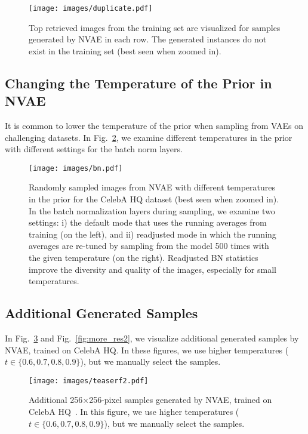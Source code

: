 \documentclass{article}
\begin{document}
\begin{figure}
\centering
\texttt{[image: images/duplicate.pdf]}
\caption{Top retrieved images from the training set are visualized for samples generated by NVAE in each row. The generated instances do not exist in the training set (best seen when zoomed in).}
\label{fig:dup}
\end{figure}

\subsection{Changing the Temperature of the Prior in NVAE}\label{app:temp}
It is common to lower the temperature of the prior when sampling from VAEs on challenging datasets. In Fig.~\ref{fig:bn_temp}, we examine different temperatures in the prior with different settings for the batch norm layers.

\begin{figure}
\centering
\texttt{[image: images/bn.pdf]}
\caption{Randomly sampled images from NVAE with different temperatures in the prior for the CelebA HQ dataset (best seen when zoomed in). In the batch normalization layers during sampling, we examine two settings: i) the default mode that uses the running averages from training (on the left), and ii) readjusted mode in which the running averages are re-tuned by sampling from the model 500 times with the given temperature (on the right). Readjusted BN statistics improve the diversity and quality of the images, especially for small temperatures.}
\label{fig:bn_temp}
\end{figure} 
\subsection{Additional Generated Samples}
In Fig.~\ref{fig:more_res1} and Fig.~\ref{fig:more_res2}, we visualize additional generated samples by NVAE, trained on CelebA HQ. In these figures, we use higher temperatures ($t \in \{0.6, 0.7, 0.8, 0.9\}$), but we manually select the samples.

\begin{figure}
\centering
\hspace{-0.9cm}
\texttt{[image: images/teaserf2.pdf]}
\caption{Additional 256$\times$256-pixel samples generated by NVAE, trained on CelebA HQ~\cite{karras2018progressive}. In this figure, we use higher temperatures ($t \in \{0.6, 0.7, 0.8, 0.9\}$), but we manually select the samples.}
\label{fig:more_res1}
\vspace{-0.3cm}
\end{figure}
\end{document}
